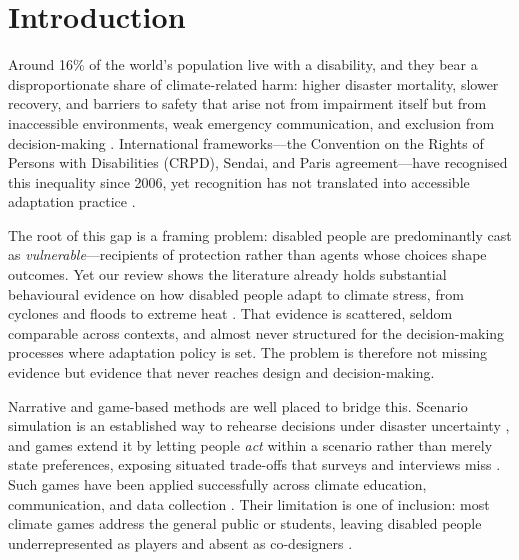 \documentclass[sigconf]{acmart}
\begin{document}
\maketitle

\section{Introduction}
Around 16\% of the world's population live with a disability, and they
bear a disproportionate share of climate-related harm: higher disaster
mortality, slower recovery, and barriers to safety that arise not from
impairment itself but from inaccessible environments, weak emergency
communication, and exclusion from decision-making
\cite{kosanic2022inclusive,gaskin2017factors,stein2024advancing}.
International frameworks---the Convention on the Rights of Persons with Disabilities (CRPD), Sendai, and Paris agreement---have recognised
this inequality since 2006, yet recognition has not translated into accessible
adaptation practice
\cite{UN_CRPD_2006,UNISDR_Sendai_Framework_2015,UN_Paris_Agreement_2015}.

The root of this gap is a framing problem: disabled people are
predominantly cast as \emph{vulnerable}---recipients of protection rather
than agents whose choices shape outcomes. Yet our review shows the
literature already holds substantial behavioural evidence on how disabled
people adapt to climate stress, from cyclones and floods to extreme heat
\cite{quaill2019queensland,skaggs2025data,villeneuve2021pcep}. That
evidence is scattered, seldom comparable across contexts, and almost
never structured for the decision-making processes where adaptation
policy is set. The problem is therefore not missing evidence but evidence
that never reaches design and decision-making.

Narrative and game-based methods are well placed to bridge this. Scenario
simulation is an established way to rehearse decisions under disaster
uncertainty \cite{TannenbaumBaruchi2024}, and games extend it by letting
people \emph{act} within a scenario rather than merely state preferences,
exposing situated trade-offs that surveys and interviews miss
\cite{somerdin2016game}. Such games have been applied successfully across
climate education, communication, and data collection
\cite{gerber2021games,mcgonigal2011reality,ulrich2014gaming}. Their
limitation is one of inclusion: most climate games address the general
public or students, leaving disabled people underrepresented as players
and absent as co-designers \cite{o2010values}.
\end{document}
